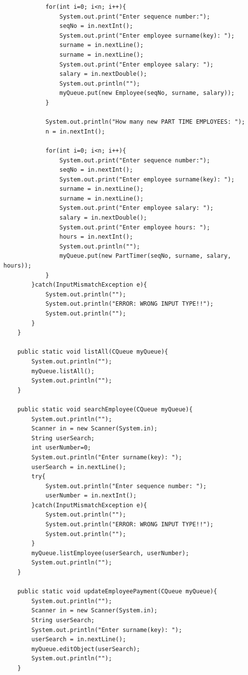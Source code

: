 \documentclass[12pt]{article}
\begin{document}
\begin{lstlisting}
            for(int i=0; i<n; i++){
                System.out.print("Enter sequence number:");
                seqNo = in.nextInt();
                System.out.print("Enter employee surname(key): ");
                surname = in.nextLine();
                surname = in.nextLine();
                System.out.print("Enter employee salary: ");
                salary = in.nextDouble();
                System.out.println("");
                myQueue.put(new Employee(seqNo, surname, salary));
            }

            System.out.println("How many new PART TIME EMPLOYEES: ");
            n = in.nextInt();
            
            for(int i=0; i<n; i++){
                System.out.print("Enter sequence number:");
                seqNo = in.nextInt();
                System.out.print("Enter employee surname(key): ");
                surname = in.nextLine();
                surname = in.nextLine();
                System.out.print("Enter employee salary: ");
                salary = in.nextDouble();
                System.out.print("Enter employee hours: ");
                hours = in.nextInt();
                System.out.println("");
                myQueue.put(new PartTimer(seqNo, surname, salary, hours));
            }
        }catch(InputMismatchException e){
            System.out.println("");
            System.out.println("ERROR: WRONG INPUT TYPE!!");
            System.out.println("");
        }   
    }

    public static void listAll(CQueue myQueue){   
        System.out.println("");    
        myQueue.listAll();
        System.out.println("");
    }

    public static void searchEmployee(CQueue myQueue){  
        System.out.println("");  
        Scanner in = new Scanner(System.in);
        String userSearch;   
        int userNumber=0;        
        System.out.println("Enter surname(key): ");
        userSearch = in.nextLine();
        try{
            System.out.println("Enter sequence number: ");
            userNumber = in.nextInt();
        }catch(InputMismatchException e){
            System.out.println("");
            System.out.println("ERROR: WRONG INPUT TYPE!!");
            System.out.println("");
        }
        myQueue.listEmployee(userSearch, userNumber);
        System.out.println("");
    }

    public static void updateEmployeePayment(CQueue myQueue){   
        System.out.println("");    
        Scanner in = new Scanner(System.in);
        String userSearch;   
        System.out.println("Enter surname(key): ");
        userSearch = in.nextLine();
        myQueue.editObject(userSearch);
        System.out.println("");
    }


\end{lstlisting}
\end{document}
